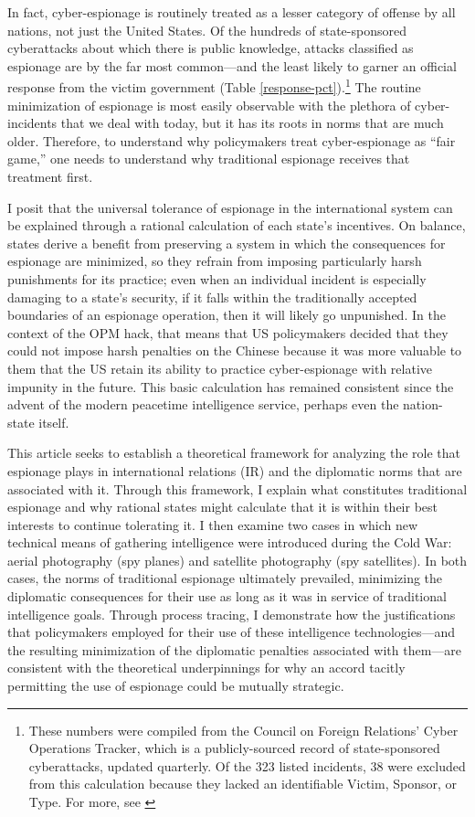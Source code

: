 \documentclass[14pt]{extarticle}
\begin{document}
In fact, cyber-espionage is routinely treated as a lesser category of offense by all nations, not just the United States. Of the hundreds of state-sponsored cyberattacks about which there is public knowledge, attacks classified as espionage are by the far most common---and the least likely to garner an official response from the victim government (Table \ref{response-pct}).\footnote{These numbers were compiled from the Council on Foreign Relations' Cyber Operations Tracker, which is a publicly-sourced record of state-sponsored cyberattacks, updated quarterly. Of the 323 listed incidents, 38 were excluded from this calculation because they lacked an identifiable Victim, Sponsor, or Type. For more, see \cite{council_on_foreign_relations_new_2019}} The routine minimization of espionage is most easily observable with the plethora of cyber-incidents that we deal with today, but it has its roots in norms that are much older. Therefore, to understand why policymakers treat cyber-espionage as \enquote{fair game,} one needs to understand why traditional espionage receives that treatment first.

I posit that the universal tolerance of espionage in the international system can be explained through a rational calculation of each state's incentives. On balance, states derive a benefit from preserving a system in which the consequences for espionage are minimized, so they refrain from imposing particularly harsh punishments for its practice; even when an individual incident is especially damaging to a state's security, if it falls within the traditionally accepted boundaries of an espionage operation, then it will likely go unpunished. In the context of the OPM hack, that means that US policymakers decided that they could not impose harsh penalties on the Chinese because it was more valuable to them that the US retain its ability to practice cyber-espionage with relative impunity in the future. This basic calculation has remained consistent since the advent of the modern peacetime intelligence service, perhaps even the nation-state itself.

This article seeks to establish a theoretical framework for analyzing the role that espionage plays in international relations (IR) and the diplomatic norms that are associated with it. Through this framework, I explain what constitutes traditional espionage and why rational states might calculate that it is within their best interests to continue tolerating it. I then examine two cases in which new technical means of gathering intelligence were introduced during the Cold War: aerial photography (spy planes) and satellite photography (spy satellites). In both cases, the norms of traditional espionage ultimately prevailed, minimizing the diplomatic consequences for their use as long as it was in service of traditional intelligence goals. Through process tracing, I demonstrate how the justifications that policymakers employed for their use of these intelligence technologies---and the resulting minimization of the diplomatic penalties associated with them---are consistent with the theoretical underpinnings for why an accord tacitly permitting the use of espionage could be mutually strategic.
\end{document}
